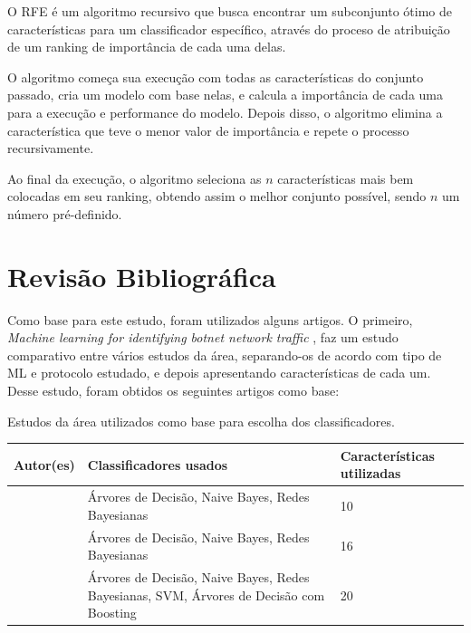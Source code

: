 O RFE é um algoritmo recursivo que busca encontrar um subconjunto ótimo de características para um classificador específico, através do proceso de atribuição de um ranking de importância de cada uma delas.

O algoritmo começa sua execução com todas as características do conjunto passado, cria um modelo com base nelas, e calcula a importância de cada uma para a execução e performance do modelo. \cite{muller2017introduction} Depois disso, o algoritmo elimina a característica que teve o menor valor de importância e repete o processo recursivamente.

Ao final da execução, o algoritmo seleciona as $n$ características mais bem colocadas em seu ranking, obtendo assim o melhor conjunto possível, sendo $n$ um número pré-definido. 

\section{Revisão Bibliográfica}

Como base para este estudo, foram utilizados alguns artigos. O primeiro, \textit{Machine learning for identifying botnet network traffic} \cite{12d2f5d1eba245f7bc2acc7487941bd7}, faz um estudo comparativo entre vários estudos da área, separando-os de acordo com tipo de ML e protocolo estudado, e depois apresentando características de cada um. Desse estudo, foram obtidos os seguintes artigos como base:

\begin{quadro}[h]
\caption{Estudos da área utilizados como base para escolha dos classificadores.}
\centering
\begin{tabular}{|p{4cm}|p{5cm}|p{3cm}|}
\hline
\textbf{\small Autor(es)} & \textbf{\small Classificadores usados} & \textbf{\small{Características utilizadas}}\\\hline
{\small \cite{livadas2006usilng}} & {\small Árvores de Decisão,
Naive Bayes, 
Redes Bayesianas} & {\small 10}\\\hline
{\small \cite{strayer2008botnet}} & {\small Árvores de Decisão, Naive Bayes, Redes Bayesianas} & {\small 16}\\\hline
{\small \cite{masud2008flow}} & {\small Árvores de Decisão, Naive Bayes, Redes Bayesianas, SVM, Árvores de Decisão com Boosting} & {\small 20}\\\hline
\end{tabular}
\label{t.articles}
\end{quadro}

